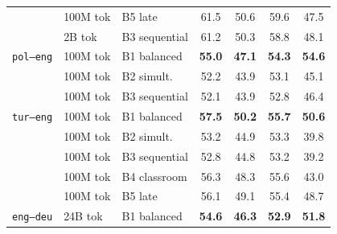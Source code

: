\documentclass[11pt]{article}
\begin{document}
\begin{table}[!ht]
\begin{minipage}[t]{0.49\linewidth}
\begin{tabular}{ll l cccc}
 & 100M tok & B5 late & \cellcolor[rgb]{0.880,1.000,0.880} 61.5 & \cellcolor[rgb]{0.992,1.000,0.992} 50.6 & \cellcolor[rgb]{0.873,1.000,0.873} 59.6 & \cellcolor[rgb]{1.000,0.972,0.972} 47.5 \\
\addlinespace[1.5pt]
 & 2B tok & B3 sequential & \cellcolor[rgb]{0.883,1.000,0.883} 61.2 & \cellcolor[rgb]{0.996,1.000,0.996} 50.3 & \cellcolor[rgb]{0.884,1.000,0.884} 58.8 & \cellcolor[rgb]{1.000,0.979,0.979} 48.1 \\
\midrule
\texttt{pol--eng} & 100M tok & B1 balanced & \cellcolor[rgb]{0.948,1.000,0.948} \textbf{55.0} & \cellcolor[rgb]{1.000,0.972,0.972} \textbf{47.1} & \cellcolor[rgb]{0.943,1.000,0.943} \textbf{54.3} & \cellcolor[rgb]{0.906,1.000,0.906} \textbf{54.6} \\
 & 100M tok & B2 simult. & \cellcolor[rgb]{0.977,1.000,0.977} 52.2 & \cellcolor[rgb]{1.000,0.941,0.941} 43.9 & \cellcolor[rgb]{0.959,1.000,0.959} 53.1 & \cellcolor[rgb]{1.000,0.946,0.946} 45.1 \\
 & 100M tok & B3 sequential & \cellcolor[rgb]{0.978,1.000,0.978} 52.1 & \cellcolor[rgb]{1.000,0.941,0.941} 43.9 & \cellcolor[rgb]{0.963,1.000,0.963} 52.8 & \cellcolor[rgb]{1.000,0.960,0.960} 46.4 \\
\midrule
\texttt{tur--eng} & 100M tok & B1 balanced & \cellcolor[rgb]{0.922,1.000,0.922} \textbf{57.5} & \cellcolor[rgb]{0.997,1.000,0.997} \textbf{50.2} & \cellcolor[rgb]{0.925,1.000,0.925} \textbf{55.7} & \cellcolor[rgb]{0.988,1.000,0.988} \textbf{50.6} \\
 & 100M tok & B2 simult. & \cellcolor[rgb]{0.967,1.000,0.967} 53.2 & \cellcolor[rgb]{1.000,0.951,0.951} 44.9 & \cellcolor[rgb]{0.956,1.000,0.956} 53.3 & \cellcolor[rgb]{1.000,0.888,0.888} 39.8 \\
 & 100M tok & B3 sequential & \cellcolor[rgb]{0.971,1.000,0.971} 52.8 & \cellcolor[rgb]{1.000,0.950,0.950} 44.8 & \cellcolor[rgb]{0.958,1.000,0.958} 53.2 & \cellcolor[rgb]{1.000,0.881,0.881} 39.2 \\
 & 100M tok & B4 classroom & \cellcolor[rgb]{0.934,1.000,0.934} 56.3 & \cellcolor[rgb]{1.000,0.984,0.984} 48.3 & \cellcolor[rgb]{0.926,1.000,0.926} 55.6 & \cellcolor[rgb]{1.000,0.923,0.923} 43.0 \\
 & 100M tok & B5 late & \cellcolor[rgb]{0.936,1.000,0.936} 56.1 & \cellcolor[rgb]{1.000,0.991,0.991} 49.1 & \cellcolor[rgb]{0.929,1.000,0.929} 55.4 & \cellcolor[rgb]{1.000,0.986,0.986} 48.7 \\
\midrule
\texttt{eng--deu} & 24B tok & B1 balanced & \cellcolor[rgb]{0.952,1.000,0.952} \textbf{54.6} & \cellcolor[rgb]{1.000,0.964,0.964} \textbf{46.3} & \cellcolor[rgb]{0.962,1.000,0.962} \textbf{52.9} & \cellcolor[rgb]{0.963,1.000,0.963} \textbf{51.8} \\

\end{tabular}
\end{minipage}
\end{table}
\end{document}
